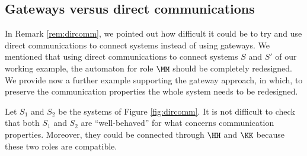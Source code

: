 



\subsection{Gateways versus direct communications}

In Remark \ref{rem:dircomm}, we pointed out how difficult it could be
 to try and use direct communications to connect systems
instead of using gateways. We mentioned that using direct communications
to connect systems $S$ and $S'$ of our working example, 
the automaton for role $\MM$ should be completely redesigned.
We provide now a further example supporting the
gateway approach, in which, to preserve the communication properties
the whole system needs to be redesigned. 

Let $S_1$ and $S_2$ be the systems of Figure \ref{fig:dircomm}.
It is not difficult to check that both $S_1$ and $S_2$ are ``well-behaved'' for what concerns communication properties.
 Moreover, they could be connected through $\HH$ and $\KK$ because these two roles are compatible.\\

